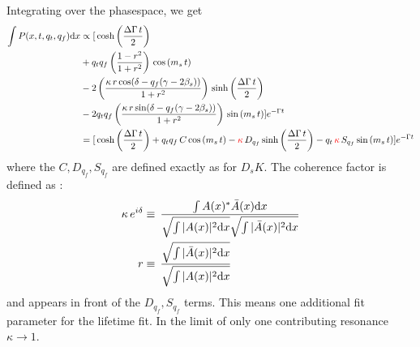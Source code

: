 Integrating over the phasespace, we get
\begin{equation}
\begin{split}
\label{eq:PDF_intX}
	\int P(x,t,q_t,q_f) \text d x &\propto   [
	\, \text{cosh} \left( \frac{\Delta \Gamma \, t}{2}\right) \\
	 & + q_t q_f \left( \frac{1-r^2}{1+r^2} \right) \, \text{cos} \left( m_s \, t \right)  \\
	 & -2 \left( \frac{\kappa \, r \, \text{cos}(\delta - q_f(\gamma - 2 \beta_s))}{1+r^2}  \right) \, \text{sinh} \left( \frac{\Delta \Gamma \, t}{2}\right)  \\
	 & -2 q_t q_f \left( \frac{\kappa \, r \, \text{sin}(\delta - q_f(\gamma - 2 \beta_s))}{1+r^2}   \right)\, \text{sin} \left( m_s \, t \right)  ]  e^{- \Gamma t} \\
	 &=   [
	\, \text{cosh} \left( \frac{\Delta \Gamma \, t}{2}\right) 
	  + q_t q_f \, C \, \text{cos} \left( m_s \, t \right)  
	  - \textcolor{red}{\kappa} \, D_{q_f} \, \text{sinh} \left( \frac{\Delta \Gamma \, t}{2}\right)  
	  - q_t \, \textcolor{red}{\kappa} \, S_{q_f}\, \text{sin} \left( m_s \, t \right)  ]  e^{- \Gamma t}
\end{split}
\end{equation}
where the $C,D_{q_f},S_{q_f}$ are defined exactly as for $D_s K$.
The coherence factor is defined as :
\begin{align}
\label{eq:coherenceFactor}
	\kappa \, e^{i\delta} &\equiv \, \frac{\int A(x)^{*}  \bar A(x)  \text d x}{\sqrt{\int \vert A(x) \vert^2\text d x} \sqrt{\int \vert \bar A(x) \vert^2\text d x}  } \\
	r &\equiv \, \frac{\sqrt{\int \vert \bar A(x) \vert^2\text d x }}{\sqrt{\int \vert A(x) \vert^2\text d x}} 
\end{align}
and appears in front of the $D_{q_f},S_{q_f}$  terms.
This means one additional fit parameter for the lifetime fit.
In the limit of only one contributing resonance $\kappa \to 1$. \\


